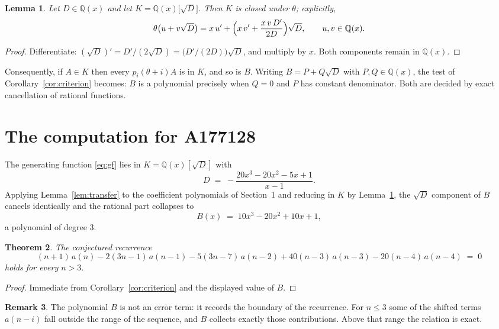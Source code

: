 \documentclass[11pt,a4paper]{article}
\theoremstyle{plain}
\newtheorem{theorem}{Theorem}
\newtheorem{lemma}[theorem]{Lemma}
\theoremstyle{definition}
\newtheorem{remark}[theorem]{Remark}
\begin{document}
\begin{lemma}\label{lem:field}
Let $D\in\mathbb{Q}(x)$ and let $K=\mathbb{Q}(x)\bigl[\sqrt{D}\bigr]$. Then $K$ is closed
under $\theta$; explicitly,
\[
\theta\bigl(u+v\sqrt{D}\bigr)=x\,u'+\Bigl(x\,v'+\frac{x\,v\,D'}{2D}\Bigr)\sqrt{D},
\qquad u,v\in\mathbb{Q}(x).
\]
\end{lemma}

\begin{proof}
Differentiate: $(\sqrt{D})'=D'/(2\sqrt{D})=\bigl(D'/(2D)\bigr)\sqrt{D}$, and multiply by
$x$. Both components remain in $\mathbb{Q}(x)$.
\end{proof}

Consequently, if $A\in K$ then every $p_{i}(\theta+i)A$ is in $K$, and so is $B$. Writing
$B=P+Q\sqrt{D}$ with $P,Q\in\mathbb{Q}(x)$, the test of Corollary~\ref{cor:criterion}
becomes: $B$ is a polynomial precisely when $Q=0$ and $P$ has constant denominator. Both
are decided by exact cancellation of rational functions.

\section{The computation for A177128}

The generating function \eqref{eq:gf} lies in $K=\mathbb{Q}(x)[\sqrt{D}]$ with
\[
D \;=\; - \frac{20 x^{3} - 20 x^{2} - 5 x + 1}{x - 1} .
\]
Applying Lemma~\ref{lem:transfer} to the coefficient polynomials of Section~1 and reducing
in $K$ by Lemma~\ref{lem:field}, the $\sqrt{D}$ component of $B$ cancels identically and
the rational part collapses to
\[
B(x)\;=\;10 x^{3} - 20 x^{2} + 10 x + 1 ,
\]
a polynomial of degree $3$.

\begin{theorem}
The conjectured recurrence
\[
(n + 1)\,a(n) -  2 \left(3 n - 1\right)\,a(n-1) -  5 \left(3 n - 7\right)\,a(n-2) + 40 \left(n - 3\right)\,a(n-3) -  20 \left(n - 4\right)\,a(n-4) \;=\;0
\]
holds for every $n>3$.
\end{theorem}

\begin{proof}
Immediate from Corollary~\ref{cor:criterion} and the displayed value of $B$.
\end{proof}

\begin{remark}
The polynomial $B$ is not an error term: it records the boundary of the recurrence. For
$n\le3$ some of the shifted terms $a(n-i)$ fall outside the range of the sequence,
and $B$ collects exactly those contributions. Above that range the relation is exact.
\end{remark}
\end{document}
